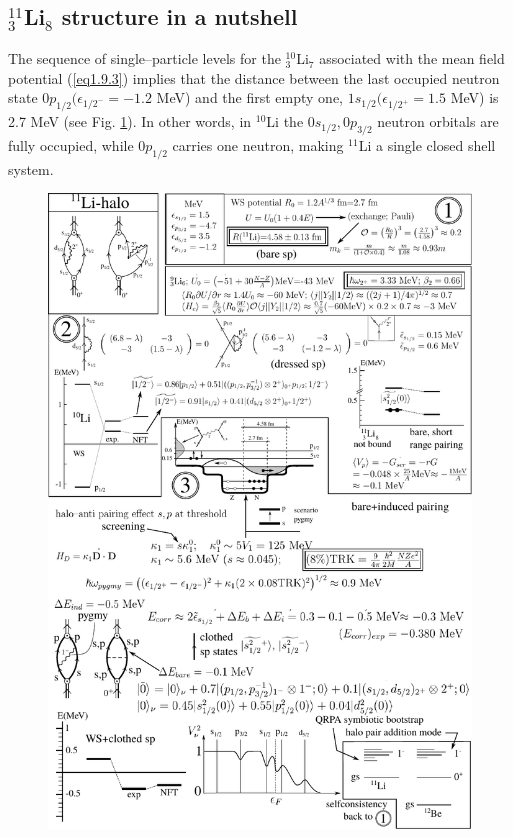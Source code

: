 \subsection{$^{11}_3$Li$_8$ structure in a nutshell}\label{S1.9.3}
The sequence of single--particle levels for the $^{10}_3$Li$_7$ associated with the mean field potential (\ref{eq1.9.3}) implies that the distance between the last occupied neutron state $0p_{1/2}(\epsilon_{1/2^-}=-1.2$ MeV) and  the first empty one, $1s_{1/2}(\epsilon_{1/2^+}=1.5$ MeV) is 2.7 MeV (see Fig. \ref{fig1.9.1}). In other words, in $^{10}$Li the $0s_{1/2},0p_{3/2}$ neutron orbitals are fully occupied, while $0p_{1/2}$ carries one neutron, making $^{11}$Li a single closed shell system.
     \begin{figure}
     \centerline {
     \includegraphics*[width=16cm]{introduccion/figs/fig1_9_1}
     }
     \caption{}
     \label{fig1.9.1}
     \end{figure}


